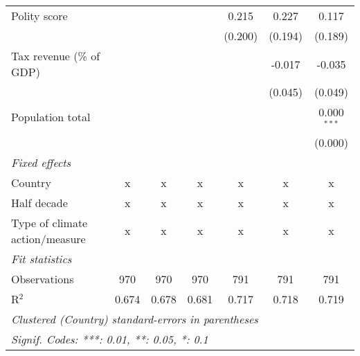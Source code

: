\begin{tabular}{lcccccc}
   Polity score                                            &              &                &                & 0.215          & 0.227          & 0.117\\   
                                                           &              &                &                & (0.200)        & (0.194)        & (0.189)\\   
   Tax revenue (\% of GDP)                                 &              &                &                &                & -0.017         & -0.035\\   
                                                           &              &                &                &                & (0.045)        & (0.049)\\   
   Population total                                        &              &                &                &                &                & 0.000$^{***}$\\   
                                                           &              &                &                &                &                & (0.000)\\   
   \emph{Fixed effects}\\
   Country                                                 & x            & x              & x              & x              & x              & x\\  
   Half decade                                             & x            & x              & x              & x              & x              & x\\  
   Type of climate action/measure                          & x            & x              & x              & x              & x              & x\\  
   \midrule \emph{Fit statistics}\\
   Observations                                            & 970          & 970            & 970            & 791            & 791            & 791\\  
   R$^2$                                                   & 0.674        & 0.678          & 0.681          & 0.717          & 0.718          & 0.719\\  
   \midrule
   \multicolumn{7}{l}{\emph{Clustered (Country) standard-errors in parentheses}}\\
   \multicolumn{7}{l}{\emph{Signif. Codes: ***: 0.01, **: 0.05, *: 0.1}}\\
\end{tabular}
\par\endgroup


